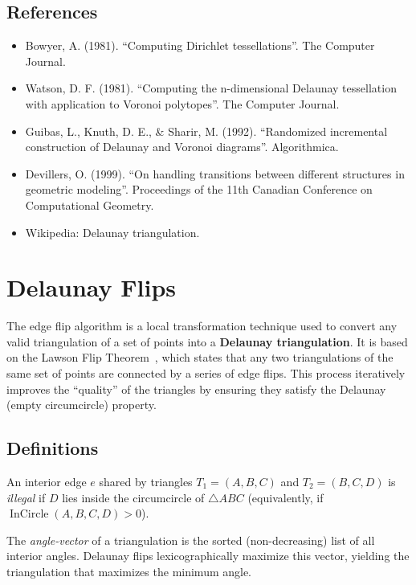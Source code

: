 \subsection{References}

\begin{itemize}
\item Bowyer, A. (1981). ``Computing Dirichlet tessellations''. The Computer Journal.
\item Watson, D. F. (1981). ``Computing the n-dimensional Delaunay tessellation with application to Voronoi polytopes''. The Computer Journal.
\item Guibas, L., Knuth, D. E., \& Sharir, M. (1992). ``Randomized incremental construction of Delaunay and Voronoi diagrams''. Algorithmica.
\item Devillers, O. (1999). ``On handling transitions between different structures in geometric modeling''. Proceedings of the 11th Canadian Conference on Computational Geometry.
\item Wikipedia: Delaunay triangulation.
\end{itemize}


\section{Delaunay Flips}
\label{sec:delaunay_flips}

The edge flip algorithm is a local transformation technique used to convert any valid triangulation of a set of points into a \textbf{Delaunay triangulation}. It is based on the Lawson Flip Theorem~\cite{lawson1977}, which states that any two triangulations of the same set of points are connected by a series of edge flips. This process iteratively improves the ``quality'' of the triangles by ensuring they satisfy the Delaunay (empty circumcircle) property.

\subsection{Definitions}

\begin{definition}\label{def:illegal_edge}
An interior edge $e$ shared by triangles $T_1 = (A, B, C)$ and $T_2 = (B, C, D)$ is \emph{illegal} if $D$ lies inside the circumcircle of $\triangle ABC$ (equivalently, if $\operatorname{InCircle}(A, B, C, D) > 0$).
\end{definition}

\begin{definition}\label{def:angle_vector}
The \emph{angle-vector} of a triangulation is the sorted (non-decreasing) list of all interior angles. Delaunay flips lexicographically maximize this vector, yielding the triangulation that maximizes the minimum angle.
\end{definition}

